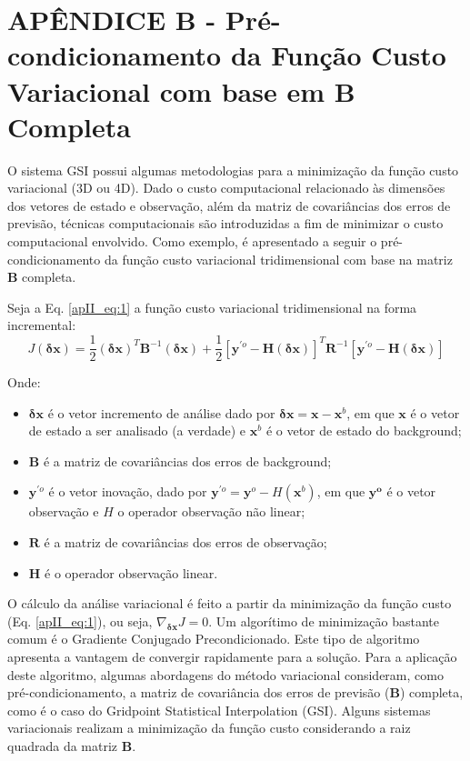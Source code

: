 
\chapter{APÊNDICE B - Pré-condicionamento da Função Custo Variacional com base em B Completa}
\label{apendiceII}

O sistema GSI possui algumas metodologias para a minimização da função custo variacional (3D ou 4D). Dado o custo computacional relacionado às dimensões dos vetores de estado e observação, além da matriz de covariâncias dos erros de previsão, técnicas computacionais são introduzidas a fim de minimizar o custo computacional envolvido. Como exemplo, é apresentado a seguir o pré-condicionamento da função custo variacional tridimensional com base na matriz $\mathbf{B}$ completa.

Seja a Eq. \ref{apII_eq:1} a função custo variacional tridimensional na forma incremental:
\begin{equation}
\label{apII_eq:1}
  J(\mathbf{\delta{x}}) = \frac{1}{2}(\mathbf{\delta{x}})^{T}\mathbf{B}^{-1}(\mathbf{\delta{x}}) + \frac{1}{2}[\mathbf{y}^{\prime{o}} - \mathbf{H}(\mathbf{\delta{x}})]^{T}\mathbf{R}^{-1}[\mathbf{y}^{\prime{o}} - \mathbf{H}(\mathbf{\delta{x}})]
\end{equation}

Onde:

\begin{itemize}
  \item $\mathbf{\delta{x}}$ é o vetor incremento de análise dado por $\mathbf{\delta{x}} = \mathbf{x} - \mathbf{x}^{b}$, em que $\mathbf{x}$ é o vetor de estado a ser analisado (a verdade) e $\mathbf{x}^{b}$ é o vetor de estado do background;
  \item $\mathbf{B}$ é a matriz de covariâncias dos erros de background;
  \item $\mathbf{y}^{\prime{o}}$ é o vetor inovação, dado por $\mathbf{y}^{\prime{o}}=\mathbf{y}^o - \textit{H}(\mathbf{x}^{b})$, em que $\mathbf{y^o}$ é o vetor observação e $\textit{H}$ o operador observação não linear;
  \item $\mathbf{R}$ é a matriz de covariâncias dos erros de observação;
  \item $\mathbf{H}$ é o operador observação linear.
\end{itemize}

O cálculo da análise variacional é feito a partir da minimização da função custo (Eq. \ref{apII_eq:1}), ou seja, $\nabla_{\mathbf{\delta{x}}}J=0$. Um algorítimo de minimização bastante comum é o Gradiente Conjugado Precondicionado. Este tipo de algoritmo apresenta a vantagem de convergir rapidamente para a solução. Para a aplicação deste algoritmo, algumas abordagens do método variacional consideram, como pré-condicionamento, a matriz de covariância dos erros de previsão ($\mathbf{B}$) completa, como é o caso do Gridpoint Statistical Interpolation (GSI). Alguns sistemas variacionais realizam a minimização da função custo considerando a raiz quadrada da matriz $\mathbf{B}$.

